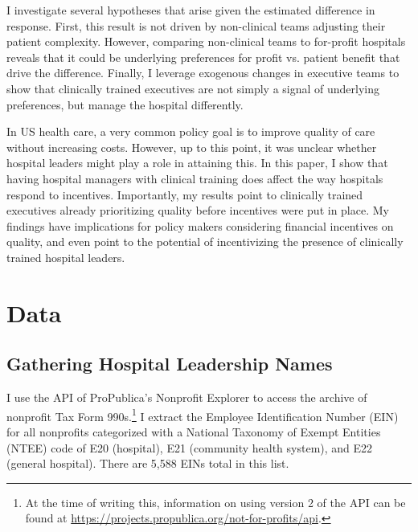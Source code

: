 \documentclass[12pt]{article}
\begin{document}
    I investigate several hypotheses that arise given the estimated difference in response. First, this result is not driven by non-clinical teams adjusting their patient complexity. However, comparing non-clinical teams to for-profit hospitals reveals that it could be underlying preferences for profit vs. patient benefit that drive the difference. Finally, I leverage exogenous changes in executive teams to show that clinically trained executives are not simply a signal of underlying preferences, but manage the hospital differently. 

    In US health care, a very common policy goal is to improve quality of care without increasing costs. However, up to this point, it was unclear whether hospital leaders might play a role in attaining this. In this paper, I show that having hospital managers with clinical training does affect the way hospitals respond to incentives. Importantly, my results point to clinically trained executives already prioritizing quality before incentives were put in place. My findings have implications for policy makers considering financial incentives on quality, and even point to the potential of incentivizing the presence of clinically trained hospital leaders. 

    

	
	\newpage

    \printbibliography

\appendix

\newpage

 \section{Data}\label{appendixdata}

\subsection{Gathering Hospital Leadership Names}

I use the API of ProPublica's Nonprofit Explorer to access the archive of nonprofit Tax Form 990s.\footnote{At the time of writing this, information on using version 2 of the API can be found at \hyperlink{https://projects.propublica.org/not-for-profits/api}{https://projects.propublica.org/not-for-profits/api}.} I extract the Employee Identification Number (EIN) for all nonprofits categorized with a National Taxonomy of Exempt Entities (NTEE) code of E20 (hospital), E21 (community health system), and E22 (general hospital). There are 5,588 EINs total in this list. 
\end{document}
